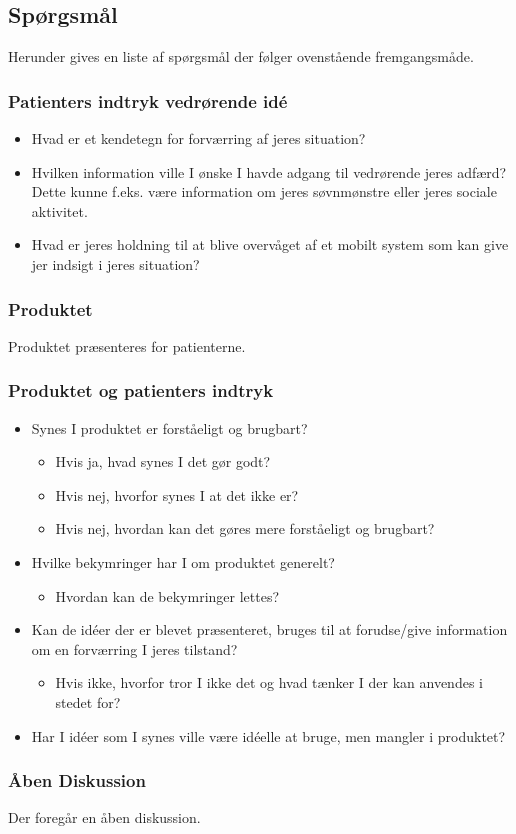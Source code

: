 \subsection*{Spørgsmål}
Herunder gives en liste af spørgsmål der følger ovenstående fremgangsmåde.

\subsubsection{Patienters indtryk vedrørende idé}
\begin{itemize}
\item Hvad er et kendetegn for forværring af jeres situation?
\item Hvilken information ville I ønske I havde adgang til vedrørende jeres adfærd? Dette kunne f.eks. være information om jeres søvnmønstre eller jeres sociale aktivitet.
\item Hvad er jeres holdning til at blive overvåget af et mobilt system som kan give jer indsigt i jeres situation?
\end{itemize}

\subsubsection*{Produktet}
Produktet præsenteres for patienterne.

\subsubsection*{Produktet og patienters indtryk}
\begin{itemize}
\item Synes I produktet er forståeligt og brugbart?
	{\begin{itemize}
	\item Hvis ja, hvad synes I det gør godt?
	\item Hvis nej, hvorfor synes I at det ikke er?
	\item Hvis nej, hvordan kan det gøres mere forståeligt og brugbart?
	\end{itemize}}
\item Hvilke bekymringer har I om produktet generelt?
	{\begin{itemize}
	\item Hvordan kan de bekymringer lettes?
	\end{itemize}}
\item Kan de idéer der er blevet præsenteret, bruges til at forudse/give information om en forværring I jeres tilstand? 
	{\begin{itemize}
	\item Hvis ikke, hvorfor tror I ikke det og hvad tænker I der kan anvendes i stedet for?
	\end{itemize}}
\item Har I idéer som I synes ville være idéelle at bruge, men mangler i produktet?
\end{itemize}

\subsubsection*{Åben Diskussion}
Der foregår en åben diskussion.

